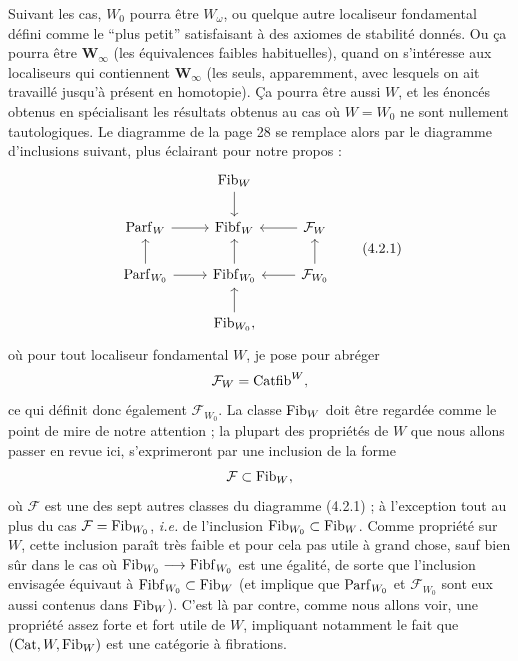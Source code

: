 Suivant les cas, $W_0$ pourra être $W_\omega$, ou quelque autre localiseur fondamental défini comme le “plus petit” satisfaisant à des axiomes de stabilité donnés. Ou ça pourra être $\mathbf{W}_\infty$ (les équivalences faibles habituelles), quand on s'intéresse aux localiseurs qui contiennent $\mathbf{W}_\infty$ (les seuls, apparemment, avec lesquels on ait travaillé jusqu'à présent en homotopie). Ça pourra être aussi $W$, et les énoncés obtenus en spécialisant les résultats obtenus au cas où $W = W_0$ ne sont nullement tautologiques. Le diagramme de la page 28 se remplace alors par le diagramme d'inclusions suivant, plus éclairant pour notre propos :
\[
\begin{tikzcd}
 & \Fib_W \arrow[d] & \\
\Parf_W \arrow[r] & \Fibf_W & \mathcal{F}_W \arrow[l] \\
\Parf_{W_0} \arrow[r] \arrow[u] & \Fibf_{W_0} \arrow[u] & \mathcal{F}_{W_0} \arrow[l] \arrow[u] \\
 & \Fib_{W_0}, \arrow[u] &
\end{tikzcd}
\tag*{(4.2.1)}
\]
où pour tout localiseur fondamental $W$, je pose pour abréger
\[
\mathcal{F}_W = \mathrm{Catfib}^W,
\]
ce qui définit donc également $\mathcal{F}_{W_0}$. La classe $\mathrm{Fib}_W$  doit être regardée comme le point de mire de notre attention ; la plupart des propriétés de $W$ que nous allons passer en revue ici, s'exprimeront par une inclusion de la forme
\[
\mathcal{F} \subset \mathrm{Fib}_W,
\]
où $\mathcal{F}$ est une des sept autres classes du diagramme (4.2.1) ; à l'exception tout au plus du cas $\mathcal{F} = \mathrm{Fib}_{W_0}$, \textit{i.e.} de l'inclusion $\mathrm{Fib}_{W_0} \subset \mathrm{Fib}_W$. Comme propriété sur $W$, cette inclusion paraît très faible et pour cela pas utile à grand chose, sauf bien sûr dans le cas où $\mathrm{Fib}_{W_0} \longrightarrow \mathrm{Fibf}_{W_0}$ est une égalité, de sorte que l'inclusion envisagée équivaut à $\mathrm{Fibf}_{W_0} \subset \mathrm{Fib}_W$ (et implique que $\mathrm{Parf}_{W_0}$ et $\mathcal{F}_{W_0}$ sont eux aussi contenus dans $\mathrm{Fib}_W$). C'est là par contre, comme nous allons voir, une propriété assez forte et fort utile de $W$, impliquant notamment le fait que $(\mathrm{Cat}, W, \mathrm{Fib}_W)$ est une catégorie à fibrations.



